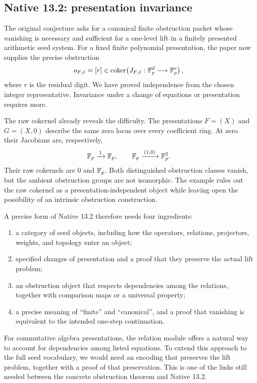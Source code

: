 \subsection{Native 13.2: presentation invariance}
\label{subsec:native132}

The original conjecture asks for a canonical finite obstruction packet whose
vanishing is necessary and sufficient for a one-level lift in a finitely
presented arithmetic seed system. For a fixed finite polynomial presentation,
the paper now supplies the precise obstruction
\[
o_{F,\bar x}=[r]\in
\operatorname{coker}\!\left(J_{F,\bar x}:\mathbb F_p^d\longrightarrow\mathbb F_p^e\right),
\]
where $r$ is the residual digit. We have proved independence from the chosen
integer representative. Invariance under a change of equations or presentation
requires more.

The raw cokernel already reveals the difficulty.
The presentations $F=(X)$ and $G=(X,0)$ describe the same zero locus over every
coefficient ring. At zero their Jacobians are, respectively,
\[
\mathbb F_p\xrightarrow{\,1\,}\mathbb F_p,
\qquad
\mathbb F_p\xrightarrow{\,(1,0)\,}\mathbb F_p^2.
\]
Their raw cokernels are $0$ and $\mathbb F_p$. Both distinguished obstruction classes
vanish, but the ambient obstruction groups are not isomorphic. The example
rules out the raw cokernel as a presentation-independent object while leaving
open the possibility of an intrinsic obstruction construction.

A precise form of Native 13.2 therefore needs four ingredients:
\begin{enumerate}
\item a category of seed objects, including how the operators, relations,
projectors, weights, and topology enter an object;
\item specified changes of presentation and a proof that they preserve the
actual lift problem;
\item an obstruction object that respects dependencies among the relations,
together with comparison maps or a universal property;
\item a precise meaning of ``finite'' and ``canonical'', and a proof that
vanishing is equivalent to the intended one-step continuation.
\end{enumerate}
For commutative algebra presentations, the relation module offers a natural
way to account for dependencies among listed equations. To extend this
approach to the full seed vocabulary, we would need an encoding that preserves
the lift problem, together with a proof of that preservation. This is one of
the links still needed between the concrete obstruction theorem and Native 13.2.

